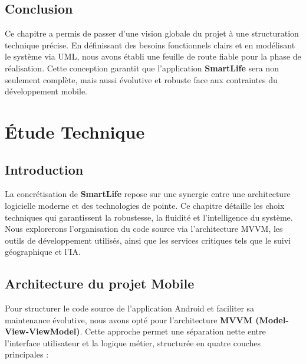 \documentclass[12pt,a4paper,oneside]{report}
\begin{document}
    \section*{Conclusion}

    Ce chapitre a permis de passer d'une vision globale du projet à une structuration technique précise. En définissant des besoins fonctionnels clairs et en modélisant le système via UML, nous avons établi une feuille de route fiable pour la phase de réalisation. Cette conception garantit que l'application \textbf{SmartLife} sera non seulement complète, mais aussi évolutive et robuste face aux contraintes du développement mobile.

\chapter{Étude Technique}

\section*{Introduction}

La concrétisation de \textbf{SmartLife} repose sur une synergie entre une architecture logicielle moderne et des technologies de pointe. Ce chapitre détaille les choix techniques qui garantissent la robustesse, la fluidité et l'intelligence du système. Nous explorerons l'organisation du code source via l'architecture MVVM, les outils de développement utilisés, ainsi que les services critiques tels que le suivi géographique et l'IA.

\section{Architecture du projet Mobile}

Pour structurer le code source de l'application Android et faciliter sa maintenance évolutive, nous avons opté pour l'architecture \textbf{MVVM (Model-View-ViewModel)}. Cette approche permet une séparation nette entre l'interface utilisateur et la logique métier, structurée en quatre couches principales :
\end{document}
